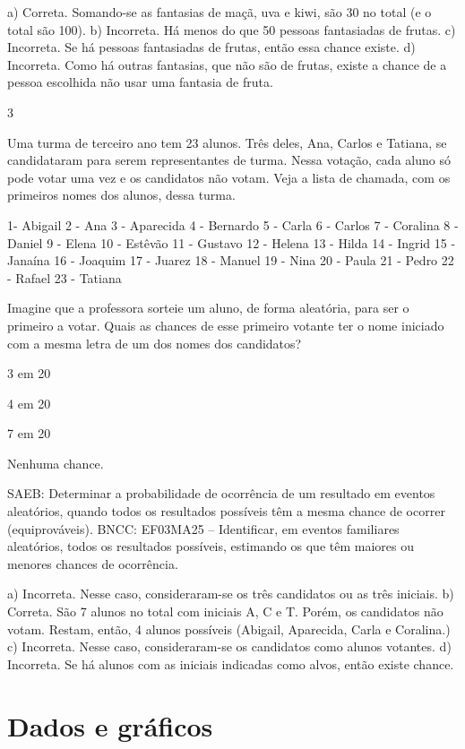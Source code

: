 \begin{multicols}{2}
{\begin{escolha}
a) Correta. Somando-se as fantasias de maçã, uva e kiwi, são 30 no total (e o total são 100).
b) Incorreta. Há menos do que 50 pessoas fantasiadas de frutas.
c) Incorreta. Se há pessoas fantasiadas de frutas, então essa chance existe.
d) Incorreta. Como há outras fantasias, que não são de frutas, existe a chance de a pessoa escolhida não usar uma fantasia de fruta.

\num{3}

Uma turma de terceiro ano tem 23 alunos. Três deles, Ana, Carlos e Tatiana, se candidataram para serem representantes de turma. Nessa votação, cada aluno só pode votar uma vez e os candidatos não votam. Veja a lista de chamada, com os primeiros nomes dos alunos, dessa turma.

1- Abigail
2 - Ana
3 - Aparecida
4 - Bernardo
5 - Carla
6 - Carlos
7 - Coralina
8 - Daniel 
9 - Elena
10 - Estêvão
11 - Gustavo
12 - Helena
13 - Hilda
14 - Ingrid
15 - Janaína
16 - Joaquim
17 - Juarez
18 - Manuel
19 - Nina
20 - Paula
21 - Pedro
22 - Rafael
23 - Tatiana

Imagine que a professora sorteie um aluno, de forma aleatória, para ser o primeiro a votar. Quais as chances de esse primeiro votante ter o nome iniciado com a mesma letra de um dos nomes dos candidatos?


\begin{escolha}
\item
3 em 20
\item
4 em 20
\item
7 em 20
\item
Nenhuma chance.
\end{escolha}

SAEB: Determinar a probabilidade de ocorrência de um resultado em eventos aleatórios, quando todos os resultados possíveis têm a mesma chance de ocorrer (equiprováveis). 
BNCC: EF03MA25 -- Identificar, em eventos familiares aleatórios, todos os resultados possíveis,
estimando os que têm maiores ou menores chances de ocorrência.

a) Incorreta. Nesse caso, consideraram-se os três candidatos ou as três iniciais.
b) Correta. São 7 alunos no total com iniciais A, C e T. Porém, os candidatos não votam. Restam, então, 4 alunos possíveis (Abigail, Aparecida, Carla e Coralina.)
c) Incorreta. Nesse caso, consideraram-se os candidatos como alunos votantes.
d) Incorreta. Se há alunos com as iniciais indicadas como alvos, então existe chance.

\chapter{Dados e gráficos}


\end{escolha}}
\end{multicols}
